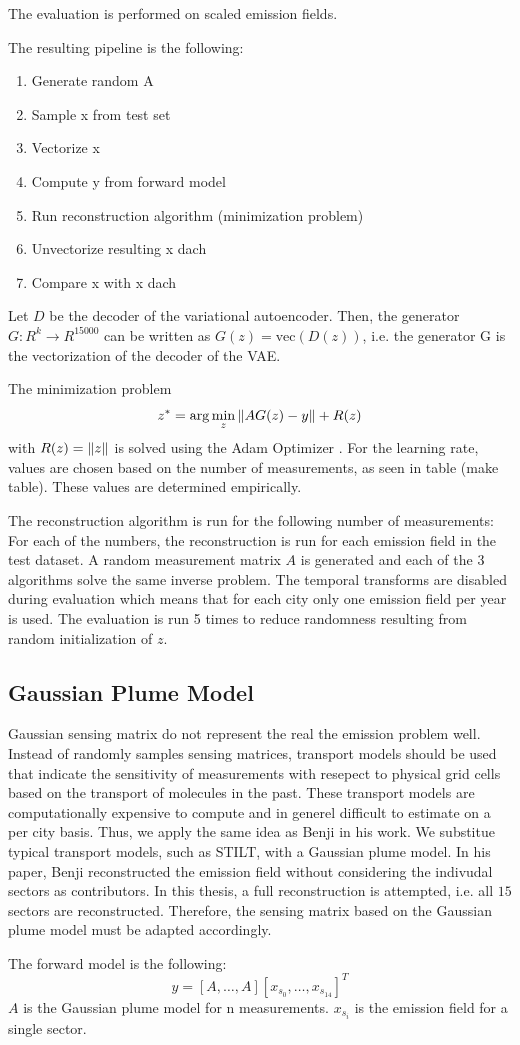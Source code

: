 The evaluation is performed on scaled emission fields.

The resulting pipeline is the following:
\begin{enumerate}
    \item Generate random A
    \item Sample x from test set
    \item Vectorize x
    \item Compute y from forward model
    \item Run reconstruction algorithm (minimization problem)
    \item Unvectorize resulting x dach
    \item Compare x with x dach
\end{enumerate}

Let $D$ be the decoder of the variational autoencoder.
Then, the generator $G: R^k \rightarrow R^{15000}$ can be written as $G(z) = \text{vec}(D(z))$, i.e. the generator G is the vectorization of the decoder of the VAE.

The minimization problem
\begin{equation}
    z^* = \arg\min_{z}{\left\lVert A G(z) - y\right\rVert + R(z)}
\end{equation}
with $R(z) = \left\lVert z\right\rVert$ is solved using the Adam Optimizer \parencite{Adam}.
For the learning rate, values are chosen based on the number of measurements, as seen in table (make table).
These values are determined empirically.

The reconstruction algorithm is run for the following number of measurements:
For each of the numbers, the reconstruction is run for each emission field in the test dataset.
A random measurement matrix $A$ is generated and each of the $3$ algorithms solve the same inverse problem.
The temporal transforms are disabled during evaluation which means that for each city only one emission field per year is used.
The evaluation is run 5 times to reduce randomness resulting from random initialization of $z$.

\subsection{Gaussian Plume Model}
Gaussian sensing matrix do not represent the real the emission problem well.
Instead of randomly samples sensing matrices, transport models should be used that indicate the sensitivity of measurements with resepect to physical grid cells based on the transport of molecules in the past.
These transport models are computationally expensive to compute and in generel difficult to estimate on a per city basis.
Thus, we apply the same idea as Benji in his work.
We substitue typical transport models, such as STILT, with a Gaussian plume model.
In his paper, Benji reconstructed the emission field without considering the indivudal sectors as contributors.
In this thesis, a full reconstruction is attempted, i.e. all $15$ sectors are reconstructed.
Therefore, the sensing matrix based on the Gaussian plume model must be adapted accordingly.

The forward model is the following:
\begin{equation}
    y = [A, \dots, A] [x_{s_0}, \dots, x_{s_{14}}]^T
\end{equation}
$A$ is the Gaussian plume model for n measurements.
$x_{s_i}$ is the emission field for a single sector.

